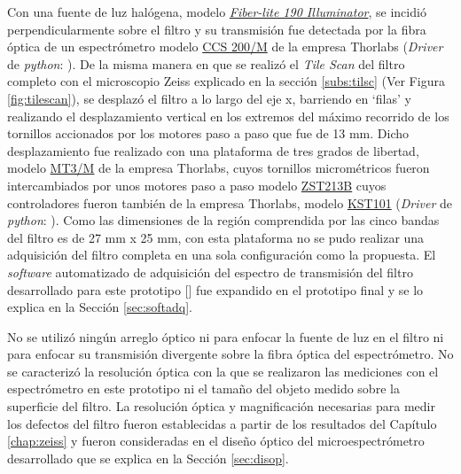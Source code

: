 Con una fuente de luz halógena, modelo \href{https://dolan-jenner.com/products/fiber-lite-190}{\textit{Fiber-lite 190 Illuminator}}, se incidió perpendicularmente sobre el filtro y su transmisión fue detectada por la fibra óptica de un espectrómetro modelo \href{https://www.thorlabs.com/thorproduct.cfm?partnumber=CCS200/M#ad-image-0}{CCS 200/M} de la empresa Thorlabs (\textit{Driver} de \textit{python}: \href{https://github.com/jrr1984/Prototipo0\_S-D\_SpectralGUI/blob/master/syst/CCS200.py}{\faGithub}). De la misma manera en que se realizó el \textit{Tile Scan} del filtro completo con el microscopio Zeiss explicado en la sección \ref{subs:tilsc} (Ver Figura \ref{fig:tilescan}), se desplazó el filtro a lo largo del eje x, barriendo en `filas' y realizando el desplazamiento vertical en los extremos del máximo recorrido de los tornillos accionados por los motores paso a paso que fue de 13 mm. Dicho desplazamiento fue realizado con una plataforma de tres grados de libertad, modelo \href{https://www.thorlabs.com/thorproduct.cfm?partnumber=MT3/M}{MT3/M} de la empresa Thorlabs, cuyos tornillos micrométricos fueron intercambiados por unos motores paso a paso modelo \href{https://www.thorlabs.com/thorproduct.cfm?partnumber=ZST213B}{ZST213B} cuyos controladores fueron también de la empresa Thorlabs, modelo \href{https://www.thorlabs.com/thorproduct.cfm?partnumber=KST101}{KST101} (\textit{Driver} de \textit{python}: \href{https://github.com/jrr1984/Prototipo0\_S-D\_SpectralGUI/blob/master/barrido/std/thor\_stepm.py}{\faGithub}). Como las dimensiones de la región comprendida por las cinco bandas del filtro es de 27 mm x 25 mm, con esta plataforma no se pudo realizar una adquisición del filtro completa en una sola configuración como la propuesta. El \textit{software} automatizado de adquisición del espectro de transmisión del filtro desarrollado para este prototipo [\href{https://github.com/jrr1984/Prototipo0\_S-D\_SpectralGUI/tree/master/barrido/std}{\faGithub}] fue expandido en el prototipo final y se lo explica en la Sección \ref{sec:softadq}.


No se utilizó ningún arreglo óptico ni para enfocar la fuente de luz en el filtro ni para enfocar su transmisión divergente sobre la fibra óptica del espectrómetro. No se caracterizó la resolución óptica con la que se realizaron las mediciones con el espectrómetro en este prototipo ni el tamaño del objeto medido sobre la superficie del filtro. La resolución óptica y magnificación necesarias para medir los defectos del filtro fueron establecidas a partir de los resultados del Capítulo \ref{chap:zeiss} y fueron consideradas en el diseño óptico del microespectrómetro desarrollado que se explica en la Sección \ref{sec:disop}.


